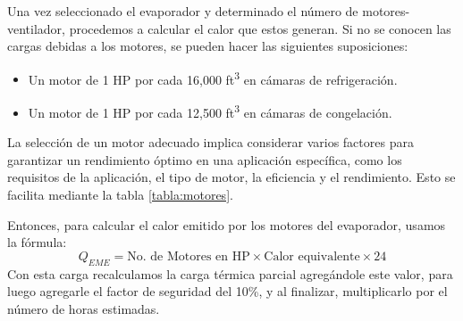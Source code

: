  Una vez seleccionado el evaporador y determinado el número de motores-ventilador, procedemos a calcular el calor que estos generan. Si no se conocen las cargas debidas a los motores, se pueden hacer las siguientes suposiciones:
 \begin{itemize}
 	\item Un motor de 1 HP por cada 16,000 ft\textsuperscript{3} en cámaras de refrigeración.\vspace*{-0.2cm}
 	\item Un motor de 1 HP por cada 12,500 ft\textsuperscript{3} en cámaras de congelación.
 \end{itemize}\vspace*{-0.2cm}
 La selección de un motor adecuado implica considerar varios factores para garantizar un rendimiento óptimo en una aplicación específica, como los requisitos de la aplicación, el tipo de motor, la eficiencia y el rendimiento. Esto se facilita mediante la tabla \ref{tabla:motores}.
 

 
 
 Entonces, para calcular el calor emitido por los motores del evaporador, usamos la fórmula:
 \begin{equation}\label{eq:emision_calor_motores}
 	Q_{EME} = \text{No. de Motores en HP} \times \text{Calor equivalente} \times 24
 \end{equation}
 Con esta carga recalculamos la carga térmica parcial agregándole este valor, para luego agregarle el factor de seguridad del 10\%, y al finalizar, multiplicarlo por el número de horas estimadas.
 
